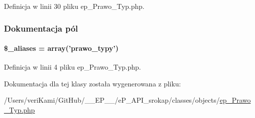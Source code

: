 Definicja w linii 30 pliku ep\-\_\-\-Prawo\-\_\-\-Typ.\-php.



\subsubsection{Dokumentacja pól}
\hypertarget{classep___prawo___typ_ab4e31d75f0bc5d512456911e5d01366b}{
\paragraph[{\$\-\_\-aliases}]{\setlength{\rightskip}{0pt plus 5cm}\$\-\_\-aliases = array('prawo\-\_\-typy')}}\label{classep___prawo___typ_ab4e31d75f0bc5d512456911e5d01366b}


Definicja w linii 4 pliku ep\-\_\-\-Prawo\-\_\-\-Typ.\-php.



Dokumentacja dla tej klasy została wygenerowana z pliku\-:\begin{DoxyCompactItemize}
\item 
/\-Users/veri\-Kami/\-Git\-Hub/\-\_\-\-\_\-\-E\-P\-\_\-\-\_\-/e\-P\-\_\-\-A\-P\-I\-\_\-srokap/classes/objects/\hyperlink{ep___prawo___typ_8php}{ep\-\_\-\-Prawo\-\_\-\-Typ.\-php}\end{DoxyCompactItemize}
